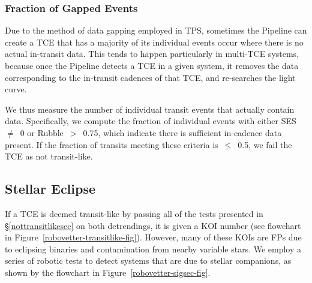 \subsubsection{Fraction of Gapped Events}
\label{s:rocky}

Due to the method of data gapping employed in TPS, sometimes the \kepler{} Pipeline can create a TCE that has a majority of its individual events occur where there is no actual in-transit data. This tends to happen particularly in multi-TCE systems, because once the \kepler{} Pipeline detects a TCE in a given system, it removes the data corresponding to the in-transit cadences of that TCE, and re-searches the light curve. 

We thus measure the number of individual transit events that actually contain data. Specifically, we compute the fraction of individual events with either SES~$\ne$~0 or Rubble~$>$~0.75, which indicate there is sufficient in-cadence data present. If the fraction of transits meeting these criteria is~$\le$~0.5, we fail the TCE as not transit-like.


\subsection{Stellar Eclipse}
\label{sigsecsec}

If a TCE is deemed transit-like by passing all of the tests presented in \S\ref{nottransitlikesec} on both detrendings, it is given a KOI number (see flowchart in Figure~\ref{robovetter-transitlike-fig}).
However, many of these KOIs are FPs due to eclipsing binaries and contamination from nearby variable stars. We employ a series of robotic tests to detect systems that are due to stellar companions, as shown by the flowchart in Figure~\ref{robovetter-sigsec-fig}.







